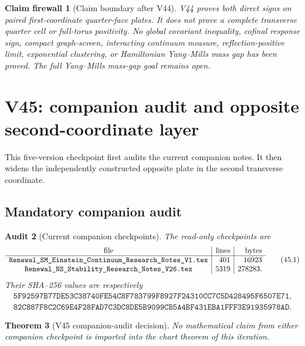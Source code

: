 \documentclass[11pt,oneside]{article}
\newtheorem{theorem}{Theorem}[section]
\newtheorem{firewall}[theorem]{Claim firewall}
\newtheorem{audit}[theorem]{Audit}
\theoremstyle{definition}
\theoremstyle{remark}
\begin{document}
\begin{firewall}[Claim boundary after V44]
\label{fire:newv44-final}
V44 proves both direct signs on paired first-coordinate
quarter-face plates.  It does not prove a complete transverse
quarter cell or full-torus positivity.  No global covariant
inequality, cofinal response sign, compact graph-screen, interacting
continuum measure, reflection-positive limit, exponential
clustering, or Hamiltonian Yang--Mills mass gap has been proved.
The full Yang--Mills mass-gap goal remains open.
\end{firewall}

\section{V45: companion audit and opposite second-coordinate layer}
\label{sec:newv45-audit-second-coordinate}

This five-version checkpoint first audits the current companion
notes.  It then widens the independently constructed opposite plate
in the second transverse coordinate.

\subsection{Mandatory companion audit}

\begin{audit}[Current companion checkpoints]
\label{aud:newv45-companions}
The read-only checkpoints are
\[
\begin{array}{c|r|r}
\hbox{file}&\hbox{lines}&\hbox{bytes}\\ \hline
\texttt{Renewal\_SM\_Einstein\_Continuum\_Research\_Notes\_V1.tex}
 &401&16923\\
\texttt{Renewal\_NS\_Stability\_Research\_Notes\_V26.tex}
 &5319&278283.
\end{array}                                             \tag{45.1}
\]
Their SHA--256 values are respectively
\[
\begin{gathered}
\texttt{5F92597B77DE53C38740FE54C8F783799F8927F24310CC7C5D428495F6507E71},\\
\texttt{82C887F8C2C69E4F28FAD7C3DC8DE5B9099CB5A4BF431EBA1FFF3E91935978AD}.
\end{gathered}                                         \tag{45.2}
\]
\end{audit}

\begin{theorem}[V45 companion-audit decision]
\label{thm:newv45-audit-decision}
No mathematical claim from either companion checkpoint is imported
into the chart theorem of this iteration.
\end{theorem}
\end{document}
